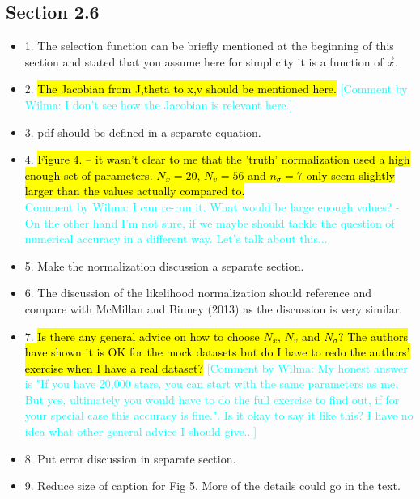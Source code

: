 \documentclass[10pt,a4paper]{article}
\newcommand{\HW}[1]{\textcolor{Cyan}{#1}}
\begin{document}
\subsection{Section 2.6}
\begin{itemize}
\item 1. The selection function can be briefly mentioned at the beginning of this section and stated that you assume here for simplicity it is a function of $\vec{x}$.
\item 2. \hl{The Jacobian from J,theta to x,v should be mentioned here.} \HW{[Comment by Wilma: I don't see how the Jacobian is relevant here.]}
\item 3. pdf should be defined in a separate equation.
\item 4. \hl{Figure 4. -- it wasn't clear to me that the 'truth' normalization used a high enough set of parameters. $N_x=20$, $N_v=56$ and $n_\sigma=7$ only seem slightly larger than the values actually compared to.}\\\HW{Comment by Wilma: I can re-run it. What would be large enough values? - On the other hand I'm not sure, if we maybe should tackle the question of numerical accuracy in a different way. Let's talk about this...}
\item 5. Make the normalization discussion a separate section.
\item 6. The discussion of the likelihood normalization should reference and compare with McMillan and Binney (2013) as the discussion is very similar.
\item 7. \hl{Is there any general advice on how to choose $N_x$, $N_v$ and $N_\sigma$? The authors have shown it is OK for the mock datasets but do I have to redo the authors' exercise when I have a real dataset?} \HW{[Comment by Wilma: My honest answer is "If you have 20,000 stars, you can start with the same parameters as me. But yes, ultimately you would have to do the full exercise to find out, if for your special case this accuracy is fine.". Is it okay to say it like this? I have no idea what other general advice I should give...]}
\item 8. Put error discussion in separate section.
\item 9. Reduce size of caption for Fig 5. More of the details could go in the text.

\end{itemize}
\end{document}
